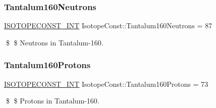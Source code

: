 \subsubsection{\texorpdfstring{Tantalum160\+Neutrons}{Tantalum160Neutrons}}
{\footnotesize\ttfamily \mbox{\hyperlink{group___isotope_const-_macros_ga5f18360b3e99483a35c32d789e62621c}{I\+S\+O\+T\+O\+P\+E\+C\+O\+N\+S\+T\+\_\+\+I\+NT}} Isotope\+Const\+::\+Tantalum160\+Neutrons = 87}

\$ \$ Neutrons in Tantalum-\/160. \mbox{\label{group___isotope_const-_tantalum-_ta160_gacb272b4b3778a7ae8bcd49206cea97aa}} 
\subsubsection{\texorpdfstring{Tantalum160\+Protons}{Tantalum160Protons}}
{\footnotesize\ttfamily \mbox{\hyperlink{group___isotope_const-_macros_ga5f18360b3e99483a35c32d789e62621c}{I\+S\+O\+T\+O\+P\+E\+C\+O\+N\+S\+T\+\_\+\+I\+NT}} Isotope\+Const\+::\+Tantalum160\+Protons = 73}

\$ \$ Protons in Tantalum-\/160. 